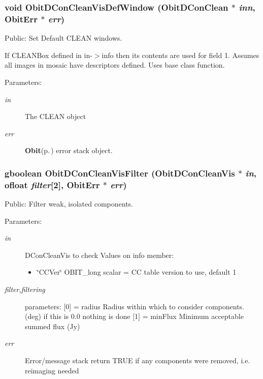 \subsubsection{\setlength{\rightskip}{0pt plus 5cm}void Obit\-DCon\-Clean\-Vis\-Def\-Window ({\bf Obit\-DCon\-Clean} $\ast$ {\em inn}, {\bf Obit\-Err} $\ast$ {\em err})}\label{ObitDConCleanVis_8h_a18}


Public: Set Default CLEAN windows. 

If CLEANBox defined in in-$>$info then its contents are used for field 1. Assumes all images in mosaic have descriptors defined. Uses base class function. \begin{Desc}
\item[Parameters:]
\begin{description}
\item[{\em in}]The CLEAN object \item[{\em err}]{\bf Obit}{\rm (p.\,\pageref{structObit})} error stack object. \end{description}
\end{Desc}
\subsubsection{\setlength{\rightskip}{0pt plus 5cm}gboolean Obit\-DCon\-Clean\-Vis\-Filter ({\bf Obit\-DCon\-Clean\-Vis} $\ast$ {\em in}, {\bf ofloat} {\em filter}[2], {\bf Obit\-Err} $\ast$ {\em err})}\label{ObitDConCleanVis_8h_a25}


Public: Filter weak, isolated components. 

\begin{Desc}
\item[Parameters:]
\begin{description}
\item[{\em in}]DCon\-Clean\-Vis to check Values on info member: \begin{itemize}
\item \char`\"{}CCVer\char`\"{} OBIT\_\-long scalar = CC table version to use, default 1 \end{itemize}
\item[{\em filter,filtering}]parameters: [0] = radius Radius within which to consider components. (deg) if this is 0.0 nothing is done [1] = min\-Flux Minimum acceptable summed flux (Jy) \item[{\em err}]Error/message stack return TRUE if any components were removed, i.e. reimaging needed \end{description}
\end{Desc}
